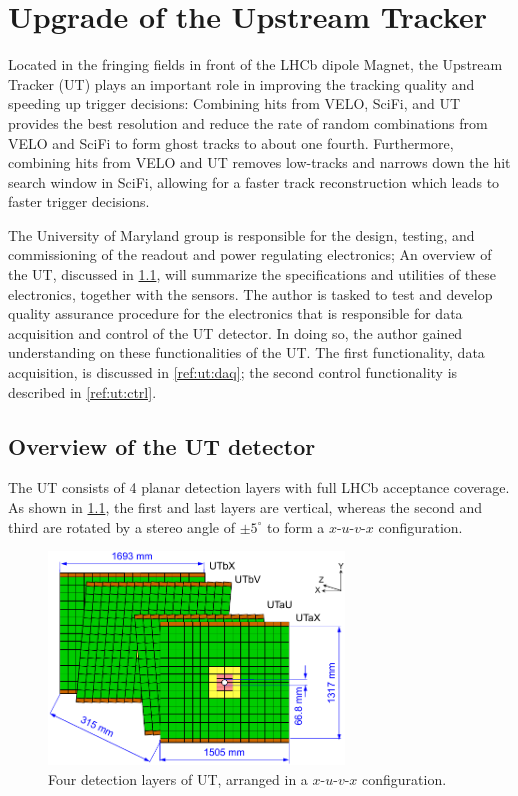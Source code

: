 \chapter{Upgrade of the Upstream Tracker}
\label{ref:ut}

Located in the fringing fields in front of the LHCb dipole Magnet,
the Upstream Tracker (UT) plays an important role in improving the tracking
quality and speeding up trigger decisions:
Combining hits from VELO, SciFi, and UT provides the best \pt resolution
and reduce the rate of random combinations from VELO and SciFi to form
ghost tracks to about one fourth.
Furthermore, combining hits from VELO and UT removes low-\pt tracks and narrows
down the hit search window in SciFi, allowing for a faster track reconstruction
which leads to faster trigger decisions.

The University of Maryland group is responsible for the design, testing, and
commissioning of the readout and power regulating electronics;
An overview of the UT, discussed in \cref{ref:ut:overview},
will summarize the specifications and utilities of these electronics,
together with the sensors.
The author is tasked to test and develop quality assurance procedure for
the electronics that is responsible for
data acquisition and control of the UT detector.
In doing so, the author gained understanding on these functionalities of the UT.
The first functionality, data acquisition, is discussed in \cref{ref:ut:daq};
the second control functionality is described in \cref{ref:ut:ctrl}.


\section{Overview of the UT detector}
\label{ref:ut:overview}

The UT consists of 4 planar detection layers with full LHCb acceptance coverage.
As shown in \cref{fig:ut-layers},
the first and last layers are vertical,
whereas the second and third are rotated by a stereo angle of $\pm 5^\circ$
to form a $x$-$u$-$v$-$x$ configuration.

\begin{figure}[!htb]
    \centering
    \includegraphics[width=0.7\textwidth]{./figs-lhcb-upgrade-overview/tracking/ut_upgrade.pdf}
    \caption{
        Four detection layers of UT,
        arranged in a $x$-$u$-$v$-$x$ configuration.
    }
    \label{fig:ut-layers}
\end{figure}

